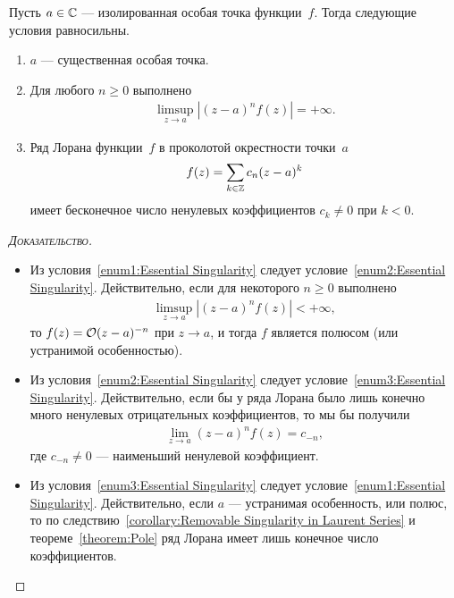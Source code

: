 \documentclass[../complex-analysis.tex]{subfiles}
\begin{document}
\begin{thm}
 Пусть $ a\in\mathbb{C} $ --- изолированная особая точка функции~$ f $. Тогда следующие условия равносильны.
 \begin{enumerate}
  \item \label{enum1:Essential Singularity} $ a $ --- существенная особая точка.
  \item \label{enum2:Essential Singularity} Для любого $ n \geqslant 0 $ выполнено
   \begin{align*}
    \limsup_{z \to a} \left| (z-a)^{n} f(z) \right| = +\infty.
   \end{align*}
  \item \label{enum3:Essential Singularity} Ряд Лорана функции~$ f $ в проколотой окрестности точки~$ a $
   \begin{align*}
    f(z) = \sum_{k \in \mathbb{Z}} c_n(z-a)^{k}
   \end{align*} имеет бесконечное число ненулевых коэффициентов $ c_k \neq 0 $ при $ k < 0 $.
 \end{enumerate}
\end{thm}
\begin{proof}[\normalfont\textsc{Доказательство}]\
 \begin{itemize}
  \item Из условия~\ref{enum1:Essential Singularity} следует условие~\ref{enum2:Essential Singularity}. Действительно, если для некоторого $ n \geqslant 0 $ выполнено
   \begin{align*}
    \limsup_{z \to a} \left| (z-a)^{n} f(z) \right| < +\infty,
   \end{align*} то $ f(z) = \mathcal{O} (z-a)^{-n} $ при $ z \to a $, и тогда $ f $ является полюсом (или устранимой особенностью).
  \item Из условия~\ref{enum2:Essential Singularity} следует условие~\ref{enum3:Essential Singularity}. Действительно, если бы у ряда Лорана было лишь конечно много ненулевых отрицательных коэффициентов, то мы бы получили
   \begin{align*}
    \lim_{z \to a} (z-a)^{n}f(z) = c_{-n},
   \end{align*} где $ c_{-n} \neq 0 $ --- наименьший ненулевой коэффициент.
  \item Из условия~\ref{enum3:Essential Singularity} следует условие~\ref{enum1:Essential Singularity}. Действительно, если $ a $ --- устранимая особенность, или полюс, то по следствию~\ref{corollary:Removable Singularity in Laurent Series} и теореме~\ref{theorem:Pole} ряд Лорана имеет лишь конечное число коэффициентов.
 \end{itemize}
\end{proof}
\end{document}
